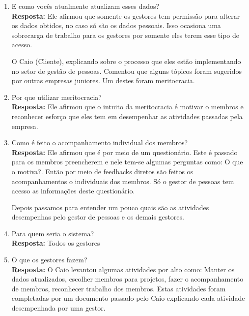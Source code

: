 \begin{anexosenv}
\begin{enumerate}
    \item E como vocês atualmente atualizam esses dados?\\
    \newline
    \textbf{Resposta:} Ele afirmou que somente os gestores tem permissão para alterar os dados obtidos, no caso só são os dados pessoais. Isso ocasiona uma sobrecarga de trabalho para os gestores por somente eles terem esse tipo de acesso.

    O Caio (Cliente), explicando sobre o processo que eles estão implementando no setor de gestão de pessoas. Comentou que alguns tópicos foram sugeridos por outras empresas juniores. Um destes foram meritocracia.

    \item Por que utilizar meritocracia?\\
    \newline
    \textbf{Resposta:} Ele afirmou que o intuito da meritocracia é motivar o membros e reconhecer esforço que eles tem em desempenhar as atividades passadas pela empresa.

    \item Como é feito o acompanhamento individual dos membros?\\
    \newline
    \textbf{Resposta:} Ele afirmou que é por meio de um questionário. Este é passado para os membros preencherem e nele tem-se algumas perguntas como: O que o motiva?. Então por meio de feedbacks diretos são feitos os acompanhamentos o individuais dos membros.
    Só o gestor de pessoas tem acesso as informações deste questionário.

    Depois passamos para entender um pouco quais são as atividades desempenhas pelo gestor de pessoas e os demais gestores.

    \item Para quem seria o sistema?\\
    \newline
    \textbf{Resposta:} Todos os gestores

    \item O que os gestores fazem?\\
    \newline
    \textbf{Resposta:} O Caio levantou algumas atividades por alto como: Manter os dados atualizados, escolher membros para projetos, fazer o acompanhamento de membros, reconhecer trabalho dos membros. Estas atividades foram completadas por um documento passado pelo Caio explicando cada atividade desempenhada por uma gestor.


\end{enumerate}
\end{anexosenv}
